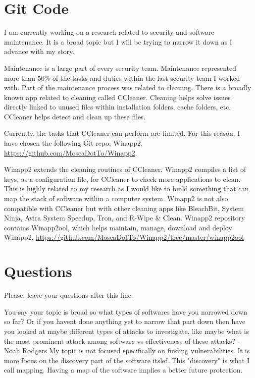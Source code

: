 \section{Git Code}
I am currently working on a research related to security and software maintenance. It is a broad topic but I will be trying to narrow it down as I advance with my story.

Maintenance is a large part of every security team. Maintenance represented more than 50\% of the tasks and duties within the last security team I worked with. Part of the maintenance process was related to cleaning. There is a broadly known app related to cleaning called CCleaner. Cleaning helps solve issues directly linked to unused files within installation folders, cache folders, etc. CCleaner helps detect and clean up these files.

Currently, the tasks that CCleaner can perform are limited. For this reason, I have chosen the following Git repo, Winapp2, \url{https://github.com/MoscaDotTo/Winapp2}.

Winapp2 extends the cleaning routines of CCleaner. Winapp2 compiles a list of keys, as a configuration file, for CCleaner to check more applications to clean.
This is highly related to my research as I would like to build something that can map the stack of software within a computer system.
Winapp2 is not also compatible with CCleaner but with other cleaning apps like BleachBit, System Ninja, Avira System Speedup, Tron, and R-Wipe \& Clean. Winapp2 repository contains Winapp2ool, which helps maintain, manage, download and deploy Winapp2, \url{https://github.com/MoscaDotTo/Winapp2/tree/master/winapp2ool}


\section{Questions}
Please, leave your questions after this line.

You say your topic is broad so what types of softwares have you narrowed down so far? Or if you havent done anything yet to narrow that part down then have you looked at maybe different types of attacks to investigate, like maybe what is the most prominent attack among software vs effectiveness of these attacks? -Noah Rodgers
My topic is not focused specifically on finding vulnerabilities. It is more focus on the discovery part of the software itslef. This "discovery" is what I call mapping. Having a map of the software implies a better future protection.

